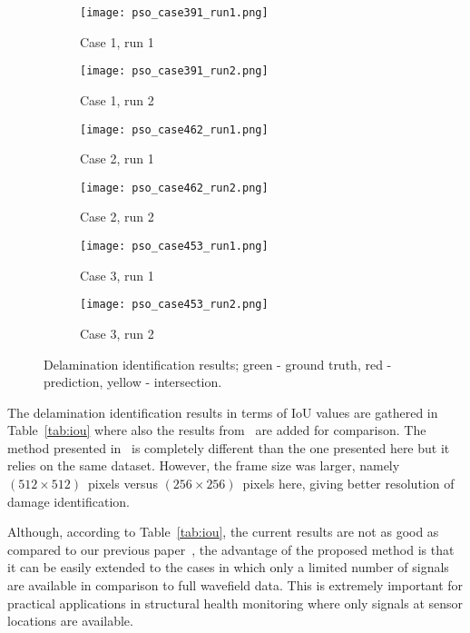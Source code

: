 \begin{figure} []
	\centering
	\begin{subfigure}[b]{0.44\textwidth}
		\centering
		\texttt{[image: pso\_case391\_run1.png]}
		\caption{Case 1, run 1}
		\label{fig:pso_case391_run1}
	\end{subfigure}
	\hfill
	\begin{subfigure}[b]{0.44\textwidth}
		\centering
		\texttt{[image: pso\_case391\_run2.png]}
		\caption{Case 1, run 2}
		\label{fig:pso_case391_run2}
	\end{subfigure}
	\hfill
	\begin{subfigure}[b]{0.44\textwidth}
		\centering
		\texttt{[image: pso\_case462\_run1.png]}
		\caption{Case 2, run 1}
		\label{fig:pso_case462_run1}
	\end{subfigure}
	\hfill
	\begin{subfigure}[b]{0.44\textwidth}
		\centering
		\texttt{[image: pso\_case462\_run2.png]}
		\caption{Case 2, run 2}
		\label{fig:pso_case462_run2}
	\end{subfigure}
	\hfill
	\begin{subfigure}[b]{0.44\textwidth}
		\centering
		\texttt{[image: pso\_case453\_run1.png]}
		\caption{Case 3, run 1}
		\label{fig:pso_case453_run1}
	\end{subfigure}
	\hfill
	\begin{subfigure}[b]{0.44\textwidth}
		\centering
		\texttt{[image: pso\_case453\_run2.png]}
		\caption{Case 3, run 2}
		\label{fig:pso_case453_run2}
	\end{subfigure}
	\hfill
	\caption{Delamination identification results; green - ground truth, red - prediction, yellow - intersection.}
	\label{fig:pso_identification}
\end{figure}

The delamination identification results in terms of IoU values are gathered in Table~\ref{tab:iou} where also the results from~\cite{Ullah2023} are added for comparison.
The method presented in~\cite{Ullah2023} is completely different than the one presented here but it relies on the same dataset.
However, the frame size was larger, namely \((512\times512)\)~pixels versus \((256\times256)\)~pixels here, giving better resolution of damage identification.

Although, according to Table~\ref{tab:iou}, the current results are not as good as compared to our previous paper~\cite{Ullah2023}, the advantage of the proposed method is that it can be easily extended to the cases in which only a limited number of signals are available in comparison to full wavefield data.
This is extremely important for practical applications in structural health monitoring where only signals at sensor locations are available.
 
